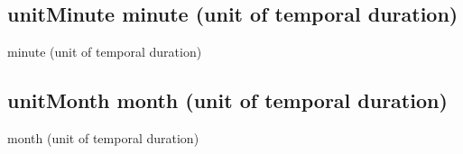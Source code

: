\documentclass[letterpaper,10pt,english]{sphinxmanual}
\begin{document}
\subsection{unitMinute \sphinxhyphen{} minute (unit of temporal duration)}
\label{\detokenize{doc-unitMinute:unitminute-minute-unit-of-temporal-duration}}\label{\detokenize{doc-unitMinute:index-0}}\label{\detokenize{doc-unitMinute::doc}}
\begin{sphinxShadowBox}

\sphinxAtStartPar
minute (unit of temporal duration)
\end{sphinxShadowBox}

\begin{sphinxShadowBox}

\sphinxAtStartPar
{}
\end{sphinxShadowBox}
\begin{quote}

\ignorespaces \end{quote}


\subsection{unitMonth \sphinxhyphen{} month (unit of temporal duration)}
\label{\detokenize{doc-unitMonth:unitmonth-month-unit-of-temporal-duration}}\label{\detokenize{doc-unitMonth:index-0}}\label{\detokenize{doc-unitMonth::doc}}
\begin{sphinxShadowBox}

\sphinxAtStartPar
month (unit of temporal duration)
\end{sphinxShadowBox}

\begin{sphinxShadowBox}

\sphinxAtStartPar
{}
\end{sphinxShadowBox}
\begin{quote}

\ignorespaces \end{quote}
\end{document}
